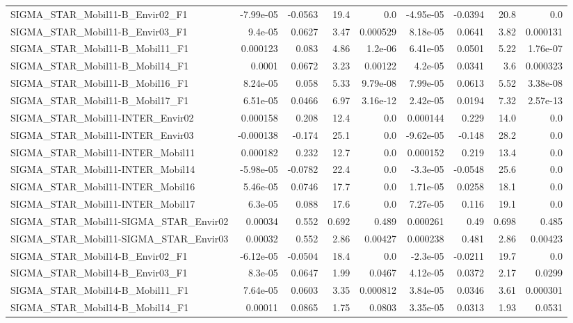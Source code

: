 \begin{tabular}{lrrrrrrrr}
SIGMA_STAR_Mobil11-B_Envir02_F1 & -7.99e-05 & -0.0563 & 19.4 & 0.0 & -4.95e-05 & -0.0394 & 20.8 & 0.0 \\
SIGMA_STAR_Mobil11-B_Envir03_F1 & 9.4e-05 & 0.0627 & 3.47 & 0.000529 & 8.18e-05 & 0.0641 & 3.82 & 0.000131 \\
SIGMA_STAR_Mobil11-B_Mobil11_F1 & 0.000123 & 0.083 & 4.86 & 1.2e-06 & 6.41e-05 & 0.0501 & 5.22 & 1.76e-07 \\
SIGMA_STAR_Mobil11-B_Mobil14_F1 & 0.0001 & 0.0672 & 3.23 & 0.00122 & 4.2e-05 & 0.0341 & 3.6 & 0.000323 \\
SIGMA_STAR_Mobil11-B_Mobil16_F1 & 8.24e-05 & 0.058 & 5.33 & 9.79e-08 & 7.99e-05 & 0.0613 & 5.52 & 3.38e-08 \\
SIGMA_STAR_Mobil11-B_Mobil17_F1 & 6.51e-05 & 0.0466 & 6.97 & 3.16e-12 & 2.42e-05 & 0.0194 & 7.32 & 2.57e-13 \\
SIGMA_STAR_Mobil11-INTER_Envir02 & 0.000158 & 0.208 & 12.4 & 0.0 & 0.000144 & 0.229 & 14.0 & 0.0 \\
SIGMA_STAR_Mobil11-INTER_Envir03 & -0.000138 & -0.174 & 25.1 & 0.0 & -9.62e-05 & -0.148 & 28.2 & 0.0 \\
SIGMA_STAR_Mobil11-INTER_Mobil11 & 0.000182 & 0.232 & 12.7 & 0.0 & 0.000152 & 0.219 & 13.4 & 0.0 \\
SIGMA_STAR_Mobil11-INTER_Mobil14 & -5.98e-05 & -0.0782 & 22.4 & 0.0 & -3.3e-05 & -0.0548 & 25.6 & 0.0 \\
SIGMA_STAR_Mobil11-INTER_Mobil16 & 5.46e-05 & 0.0746 & 17.7 & 0.0 & 1.71e-05 & 0.0258 & 18.1 & 0.0 \\
SIGMA_STAR_Mobil11-INTER_Mobil17 & 6.3e-05 & 0.088 & 17.6 & 0.0 & 7.27e-05 & 0.116 & 19.1 & 0.0 \\
SIGMA_STAR_Mobil11-SIGMA_STAR_Envir02 & 0.00034 & 0.552 & 0.692 & 0.489 & 0.000261 & 0.49 & 0.698 & 0.485 \\
SIGMA_STAR_Mobil11-SIGMA_STAR_Envir03 & 0.00032 & 0.552 & 2.86 & 0.00427 & 0.000238 & 0.481 & 2.86 & 0.00423 \\
SIGMA_STAR_Mobil14-B_Envir02_F1 & -6.12e-05 & -0.0504 & 18.4 & 0.0 & -2.3e-05 & -0.0211 & 19.7 & 0.0 \\
SIGMA_STAR_Mobil14-B_Envir03_F1 & 8.3e-05 & 0.0647 & 1.99 & 0.0467 & 4.12e-05 & 0.0372 & 2.17 & 0.0299 \\
SIGMA_STAR_Mobil14-B_Mobil11_F1 & 7.64e-05 & 0.0603 & 3.35 & 0.000812 & 3.84e-05 & 0.0346 & 3.61 & 0.000301 \\
SIGMA_STAR_Mobil14-B_Mobil14_F1 & 0.00011 & 0.0865 & 1.75 & 0.0803 & 3.35e-05 & 0.0313 & 1.93 & 0.0531 \\

\end{tabular}
